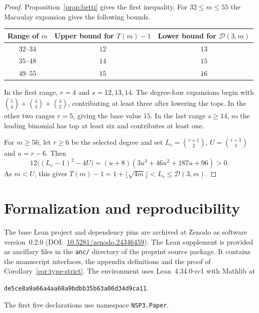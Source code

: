\documentclass[11pt]{article}
\theoremstyle{definition}
\theoremstyle{remark}
\theoremstyle{plain}
\begin{document}
\begin{proof}
Proposition~\ref{prop:betti} gives the first inequality.
For $32\le m\le55$ the Macaulay expansion gives the following bounds.
\begin{center}
\begin{tabular}{c|c|c}
Range of $m$ & Upper bound for $T(m)-1$ & Lower bound for $\mathcal D(3,m)$\\\hline
$32$--$34$ & $12$ & $13$\\
$35$--$48$ & $14$ & $15$\\
$49$--$55$ & $15$ & $16$
\end{tabular}
\end{center}
In the first range, $r=4$ and $s=12,13,14$. The degree-four expansions
begin with $\binom54+\binom43+\binom32$, contributing at least
three after lowering the tops. In the other two ranges $r=5$,
giving the base value $15$. In the last range $s\ge14$,
so the leading binomial has top at least six and contributes at least one.

For $m\ge56$, let $r\ge6$ be the selected degree and set
$L_r=\binom{r+1}{2}$, $U=\binom{r+3}{3}$ and $u=r-6$. Then
\[
12\bigl((L_r-1)^2-4U\bigr)
=(u+8)(3u^3+46u^2+187u+96)>0.
\]
As $m<U$, this gives
$T(m)-1=1+\lfloor\sqrt{4m}\rfloor<L_r\le\mathcal D(3,m)$.
\end{proof}

\section*{Formalization and reproducibility}
The base Lean project and dependency pins are archived at Zenodo as
software version~0.2.0
\mbox{(DOI: \href{https://doi.org/10.5281/zenodo.24346459}{10.5281/zenodo.24346459})}.
The Lean supplement is provided as ancillary files in the \texttt{anc/}
directory of the preprint source package. It contains the manuscript
interfaces, the appendix definitions and the proof of
Corollary~\ref{cor:type-strict}.
The environment uses Lean~4.34.0-rc1 with Mathlib at
\begin{center}\small
\texttt{de5ce8a9a66a4aa68a9bdbb35b63a06d34d9ca11}.
\end{center}

The first five declarations use namespace \texttt{NSP3.Paper}.
\end{document}
